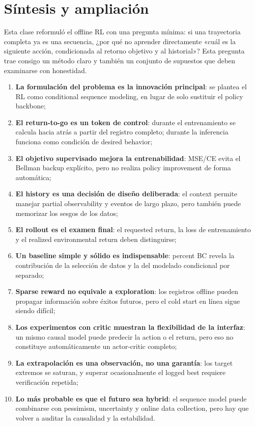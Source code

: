 \section{Síntesis y ampliación}

Esta clase reformuló el offline RL con una pregunta mínima: si una trayectoria completa ya es una secuencia, ¿por qué no aprender directamente «cuál es la siguiente acción, condicionada al retorno objetivo y al historial»? Esta pregunta trae consigo un método claro y también un conjunto de supuestos que deben examinarse con honestidad.

\begin{enumerate}
  \item \textbf{La formulación del problema es la innovación principal}: se plantea el RL como conditional sequence modeling, en lugar de solo sustituir el policy backbone;
  \item \textbf{El return-to-go es un token de control}: durante el entrenamiento se calcula hacia atrás a partir del registro completo; durante la inferencia funciona como condición de desired behavior;
  \item \textbf{El objetivo supervisado mejora la entrenabilidad}: MSE/CE evita el Bellman backup explícito, pero no realiza policy improvement de forma automática;
  \item \textbf{El history es una decisión de diseño deliberada}: el context permite manejar partial observability y eventos de largo plazo, pero también puede memorizar los sesgos de los datos;
  \item \textbf{El rollout es el examen final}: el requested return, la loss de entrenamiento y el realized environmental return deben distinguirse;
  \item \textbf{Un baseline simple y sólido es indispensable}: percent BC revela la contribución de la selección de datos y la del modelado condicional por separado;
  \item \textbf{Sparse reward no equivale a exploration}: los registros offline pueden propagar información sobre éxitos futuros, pero el cold start en línea sigue siendo difícil;
  \item \textbf{Los experimentos con critic muestran la flexibilidad de la interfaz}: un mismo causal model puede predecir la action o el return, pero eso no constituye automáticamente un actor-critic completo;
  \item \textbf{La extrapolación es una observación, no una garantía}: los target extremos se saturan, y superar ocasionalmente el logged best requiere verificación repetida;
  \item \textbf{Lo más probable es que el futuro sea hybrid}: el sequence model puede combinarse con pessimism, uncertainty y online data collection, pero hay que volver a auditar la causalidad y la estabilidad.
\end{enumerate}

